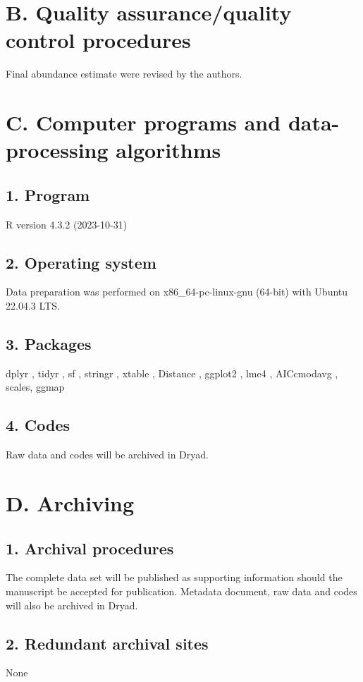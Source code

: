 \documentclass[a4paper,twoside,12pt]{article}
\begin{document}
    \section*{B. Quality assurance/quality control procedures}
    Final abundance estimate were revised by the authors.

    \section*{C. Computer programs and data-processing algorithms}
         \subsection*{1. Program} R version 4.3.2 (2023-10-31)
         \subsection*{2. Operating system} Data preparation was performed on x86\_64-pc-linux-gnu (64-bit) with Ubuntu 22.04.3 LTS.
         \subsection*{3. Packages} dplyr \citep{dplyr}, tidyr \citep{tidyr}, sf \citep{sf}, stringr \citep{stringr}, xtable \citep{xtable}, Distance \citep{miller2019}, ggplot2 \citep{ggplot2}, lme4 \citep{lme4}, AICcmodavg \citep{AICcmodavg}, scales\citep{scales}, ggmap \citep{ggmap}
         \subsection*{4. Codes} Raw data and codes will be archived in Dryad.
                
    \section*{D. Archiving}
         \subsection*{1. Archival procedures} The complete data set will be published as supporting information should the manuscript be accepted for publication. Metadata document, raw data and codes will also be archived in Dryad.
         \subsection*{2. Redundant archival sites} None
            
\end{document}
